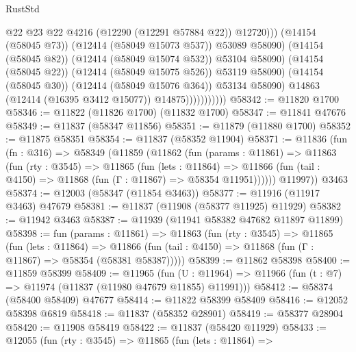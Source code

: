 \begin{lexlean}{RustStd}
\begin{coremodule}
                                        @22
                                        @23
                                        @22
                                        @4216
                                        (@12290 (@12291 @57884 @22))
                                        @12720)))
                                  (@14154 (@58045 @73))
                                  (@12414 (@58049 @15073 @537))
                                  @53089
                                  @58090)
                                (@14154 (@58045 @82))
                                (@12414 (@58049 @15074 @532))
                                @53104
                                @58090)
                              (@14154 (@58045 @22))
                              (@12414 (@58049 @15075 @526))
                              @53119
                              @58090)
                            (@14154 (@58045 @30))
                            (@12414 (@58049 @15076 @364))
                            @53134
                            @58090)
                          @14863
                          (@12414 (@16395 @3412 @15077))
                          @14875)))))))))))
@58342 := @11820 @1700
@58346 := @11822 (@11826 @1700) (@11832 @1700)
@58347 := @11841 @47676
@58349 := @11837 (@58347 @11856)
@58351 := @11879 (@11880 @1700)
@58352 := @11875 @58351
@58354 := @11837 (@58352 @11904)
@58371 := @11836
    (fun (fn : @316) =>
    @58349
      (@11859
        (@11862
          (fun (params : @11861) =>
          @11863
            (fun (rty : @3545) =>
            @11865
              (fun (lets : @11864) =>
              @11866 (fun (tail : @4150) => @11868 (fun (Γ : @11867) => @58354 @11951))))))
        @11997))
    @3463
@58374 := @12003 (@58347 (@11854 @3463))
@58377 := @11916 (@11917 @3463) @47679
@58381 := @11837 (@11908 (@58377 @11925) @11929)
@58382 := @11942 @3463
@58387 := @11939 (@11941 @58382 @47682 @11897 @11899)
@58398 := fun (params : @11861) =>
  @11863
    (fun (rty : @3545) =>
    @11865
      (fun (lets : @11864) =>
      @11866 (fun (tail : @4150) => @11868 (fun (Γ : @11867) => @58354 (@58381 @58387)))))
@58399 := @11862 @58398
@58400 := @11859 @58399
@58409 := @11965
    (fun (U : @11964) => @11966 (fun (t : @7) => @11974 (@11837 (@11980 @47679 @11855) @11991)))
@58412 := @58374 (@58400 @58409) @47677
@58414 := @11822 @58399 @58409
@58416 := @12052 @58398 @6819
@58418 := @11837 (@58352 @28901)
@58419 := @58377 @28904
@58420 := @11908 @58419
@58422 := @11837 (@58420 @11929)
@58433 := @12055
    (fun (rty : @3545) =>
    @11865
      (fun (lets : @11864) =>

\end{coremodule}
\end{lexlean}
